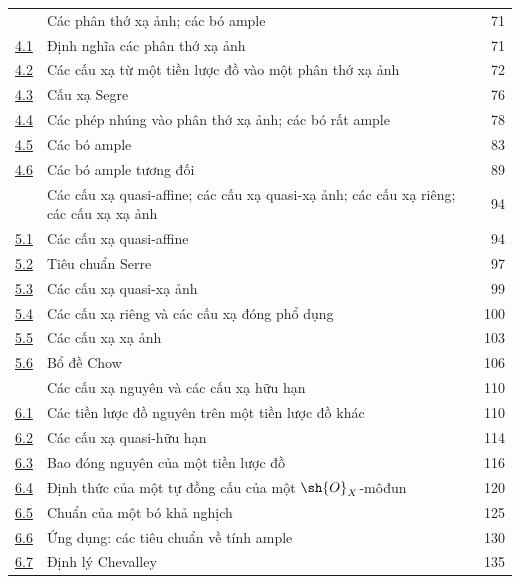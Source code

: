 \documentclass[oneside,10pt]{amsart}
\begin{document}
\begin{longtable}{@{}p{}p{}r@{}}
\hyperref[section:II.4]{\textsection4} & Các phân thớ xạ ảnh; các bó ample & 71\\
\hyperref[subsection:II.4.1]{4.1} & Định nghĩa các phân thớ xạ ảnh & 71\\
\hyperref[subsection:II.4.2]{4.2} & Các cấu xạ từ một tiền lược đồ vào một phân thớ xạ ảnh & 72\\
\hyperref[subsection:II.4.3]{4.3} & Cấu xạ Segre & 76\\
\hyperref[subsection:II.4.4]{4.4} & Các phép nhúng vào phân thớ xạ ảnh; các bó rất ample & 78\\
\hyperref[subsection:II.4.5]{4.5} & Các bó ample & 83\\
\hyperref[subsection:II.4.6]{4.6} & Các bó ample tương đối & 89\\
\hyperref[section:II.5]{\textsection5} & Các cấu xạ quasi-affine; các cấu xạ quasi-xạ ảnh; các cấu xạ riêng; các cấu xạ xạ ảnh & 94\\
\hyperref[subsection:II.5.1]{5.1} & Các cấu xạ quasi-affine & 94\\
\hyperref[subsection:II.5.2]{5.2} & Tiêu chuẩn Serre & 97\\
\hyperref[subsection:II.5.3]{5.3} & Các cấu xạ quasi-xạ ảnh & 99\\
\hyperref[subsection:II.5.4]{5.4} & Các cấu xạ riêng và các cấu xạ đóng phổ dụng & 100\\
\hyperref[subsection:II.5.5]{5.5} & Các cấu xạ xạ ảnh & 103\\
\hyperref[subsection:II.5.6]{5.6} & Bổ đề Chow & 106\\
\hyperref[section:II.6]{\textsection6} & Các cấu xạ nguyên và các cấu xạ hữu hạn & 110\\
\hyperref[subsection:II.6.1]{6.1} & Các tiền lược đồ nguyên trên một tiền lược đồ khác & 110\\
\hyperref[subsection:II.6.2]{6.2} & Các cấu xạ quasi-hữu hạn & 114\\
\hyperref[subsection:II.6.3]{6.3} & Bao đóng nguyên của một tiền lược đồ & 116\\
\hyperref[subsection:II.6.4]{6.4} & Định thức của một tự đồng cấu của một $\sh{O}_X$-môđun & 120\\
\hyperref[subsection:II.6.5]{6.5} & Chuẩn của một bó khả nghịch & 125\\
\hyperref[subsection:II.6.6]{6.6} & Ứng dụng: các tiêu chuẩn về tính ample & 130\\
\hyperref[subsection:II.6.7]{6.7} & Định lý Chevalley & 135\\

\end{longtable}
\end{document}
